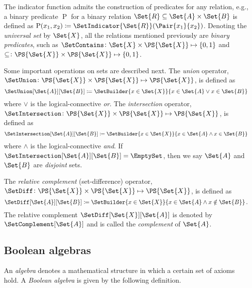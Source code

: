 \documentclass[../main.tex]{subfiles}
\begin{document}
The indicator function admits the construction of predicates for any relation, e.g., a binary predicate $\operatorname{P}$ for a binary relation $\Set{R} \subseteq \Set{A} \times \Set{B}$ is defined as $\operatorname{P}(x_1,x_2) \coloneqq \SetIndicator{\Set{R}}(\Pair{x_1}{x_2})$.
Denoting the \emph{universal set} by $\Set{X}$, all the relations mentioned previously are \emph{binary predicates}, such as $\SetContains \colon \Set{X} \times \PS{\Set{X}} \mapsto \{0,1\}$ and $\subseteq \colon \PS{\Set{X}} \times \PS{\Set{X}} \mapsto \{0,1\}$.

Some important operations on sets are described next.
The \emph{union} operator, $\SetUnion \colon \PS{\Set{X}} \times \PS{\Set{X}} \mapsto \PS{\Set{X}}$, is defined as
\begin{equation}
\SetUnion[\Set{A}][\Set{B}] \coloneqq \SetBuilder{ x \in \Set{X}}{x \in \Set{A} 
\lor x \in \Set{B}}
\end{equation}
where $\lor$ is the logical-connective \emph{or}. The \emph{intersection} operator, $\SetIntersection \colon \PS{\Set{X}} \times \PS{\Set{X}} \mapsto \PS{\Set{X}}$, is defined as
\begin{equation}
\SetIntersection[\Set{A}][\Set{B}] \coloneqq \SetBuilder{ x \in \Set{X}}{x \in \Set{A} 
\land x \in \Set{B}}
\end{equation}
where $\land$ is the logical-connective \emph{and}. If $\SetIntersection[\Set{A}][\Set{B}] = \EmptySet$, then we say $\Set{A}$ and $\Set{B}$ are \emph{disjoint} sets.

The \emph{relative complement} (set-difference) operator, $\SetDiff \colon \PS{\Set{X}} \times \PS{\Set{X}} \mapsto \PS{\Set{X}}$, is defined as
\begin{equation}
\SetDiff[\Set{A}][\Set{B}] \coloneqq \SetBuilder{ x \in \Set{X}}{x \in \Set{A} 
\land x \notin \Set{B}}\,.
\end{equation}
The relative complement $\SetDiff[\Set{X}][\Set{A}]$ is denoted by $\SetComplement[\Set{A}]$ and is called the \emph{complement} of $\Set{A}$.

\subsection{Boolean algebras}
An \emph{algebra} denotes a mathematical structure in which a certain set of axioms hold.
A \emph{Boolean algebra} is given by the following definition.

\newcommand{\meet}{\land}
\newcommand{\join}{\lor}
\end{document}
